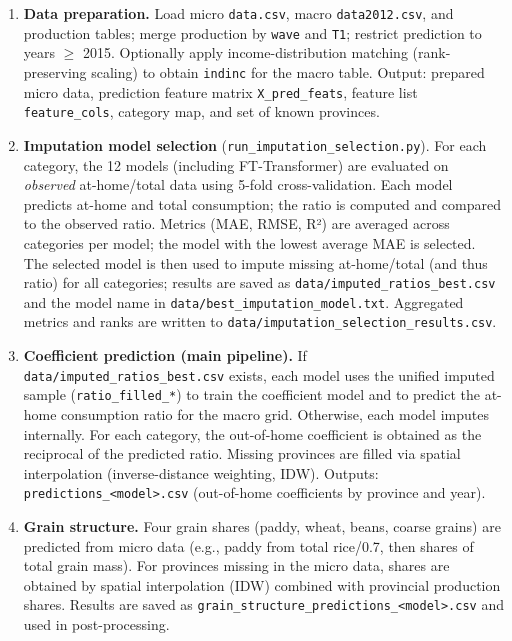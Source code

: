 \begin{enumerate}
  \item \textbf{Data preparation.}
  Load micro \texttt{data.csv}, macro \texttt{data2012.csv}, and production tables; merge production by \texttt{wave} and \texttt{T1}; restrict prediction to years $\geq$ 2015. Optionally apply income-distribution matching (rank-preserving scaling) to obtain \texttt{indinc} for the macro table. Output: prepared micro data, prediction feature matrix \texttt{X\_pred\_feats}, feature list \texttt{feature\_cols}, category map, and set of known provinces.

  \item \textbf{Imputation model selection} (\texttt{run\_imputation\_selection.py}).
  For each category, the 12 models (including FT-Transformer) are evaluated on \emph{observed} at-home/total data using 5-fold cross-validation. Each model predicts at-home and total consumption; the ratio is computed and compared to the observed ratio. Metrics (MAE, RMSE, R²) are averaged across categories per model; the model with the lowest average MAE is selected. The selected model is then used to impute missing at-home/total (and thus ratio) for all categories; results are saved as \texttt{data/imputed\_ratios\_best.csv} and the model name in \texttt{data/best\_imputation\_model.txt}. Aggregated metrics and ranks are written to \texttt{data/imputation\_selection\_results.csv}.

  \item \textbf{Coefficient prediction (main pipeline).}
  If \texttt{data/imputed\_ratios\_best.csv} exists, each model uses the unified imputed sample (\texttt{ratio\_filled\_*}) to train the coefficient model and to predict the at-home consumption ratio for the macro grid. Otherwise, each model imputes internally. For each category, the out-of-home coefficient is obtained as the reciprocal of the predicted ratio. Missing provinces are filled via spatial interpolation (inverse-distance weighting, IDW). Outputs: \texttt{predictions\_<model>.csv} (out-of-home coefficients by province and year).

  \item \textbf{Grain structure.}
  Four grain shares (paddy, wheat, beans, coarse grains) are predicted from micro data (e.g., paddy from total rice/0.7, then shares of total grain mass). For provinces missing in the micro data, shares are obtained by spatial interpolation (IDW) combined with provincial production shares. Results are saved as \texttt{grain\_structure\_predictions\_<model>.csv} and used in post-processing.


\end{enumerate}
